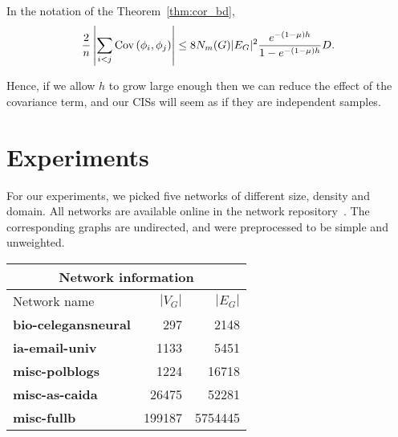 \begin{corollary}
In the notation of the Theorem~\ref{thm:cor_bd},
\begin{equation*}
    \frac{2}{n} \left\vert\sum_{i < j} \mathrm{Cov}\left(\phi_i, \phi_j\right) \right\vert \leq
     8 N_m(G)|E_G|^2 \frac{e^{- (1-\mu) h}}{1- e^{- (1-\mu) h}} D.
\end{equation*}
\end{corollary}

Hence, if we allow $h$ to grow large enough then we can reduce the effect of the covariance term, and our CISs will seem as if they are independent samples.

\section{Experiments}

For our experiments, we picked five networks of different size, density and domain.
All networks are available online in the network repository~\cite{nr-aaai15}.
The corresponding graphs are undirected, and were preprocessed to be simple and unweighted.

\begin{center}
        \begin{tabular}{ | l || r | r | }
        \hline
        \multicolumn{3}{|c|}{Network information} \\
        \hline
        Network name & $|V_G|$ & $|E_G|$ \\ \hline
        \textbf{bio-celegansneural} & 297 & 2148 \\
        \textbf{ia-email-univ} & 1133 & 5451 \\
        \textbf{misc-polblogs} & 1224 & 16718 \\
        \textbf{misc-as-caida} & 26475 & 52281 \\
        \textbf{misc-fullb} & 199187 & 5754445 \\
        \hline
    \end{tabular}
\end{center}



